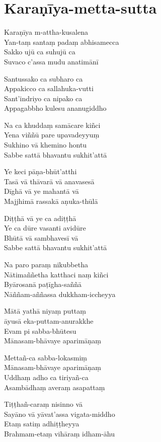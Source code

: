 
\chapter{Karaṇīya-metta-sutta}

Karaṇīya m-attha-kusalena\\
Yan-taṃ santaṃ padaṃ abhisamecca\\
Sakko ujū ca suhujū ca\\
Suvaco c'assa mudu anatimānī

Santussako ca subharo ca\\
Appakicco ca sallahuka-vutti\\
Sant'indriyo ca nipako ca\\
Appagabbho kulesu ananugiddho

Na ca khuddaṃ samācare kiñci\\
Yena viññū pare upavadeyyuṃ\\
Sukhino vā khemino hontu\\
Sabbe sattā bhavantu sukhit'attā

Ye keci pāṇa-bhūt'atthi\\
Tasā vā thāvarā vā anavasesā\\
Dīghā vā ye mahantā vā\\
Majjhimā rassakā aṇuka-thūlā

Diṭṭhā vā ye ca adiṭṭhā\\
Ye ca dūre vasanti avidūre\\
Bhūtā vā sambhavesī vā\\
Sabbe sattā bhavantu sukhit'attā

Na paro paraṃ nikubbetha\\
Nātimaññetha katthaci naṃ kiñci\\
Byārosanā paṭīgha-saññā\\
Nāññam-aññassa dukkham-iccheyya

Mātā yathā niyaṃ puttaṃ\\
āyusā eka-puttam-anurakkhe\\
Evam pi sabba-bhūtesu\\
Mānasam-bhāvaye aparimāṇaṃ

Mettañ-ca sabba-lokasmiṃ\\
Mānasam-bhāvaye aparimāṇaṃ\\
Uddhaṃ adho ca tiriyañ-ca\\
Asambādhaṃ averaṃ asapattaṃ

Tiṭṭhañ-caraṃ nisinno vā\\
Sayāno vā yāvat'assa vigata-middho\\
Etaṃ satiṃ adhiṭṭheyya\\
Brahmam-etaṃ vihāraṃ idham-āhu

